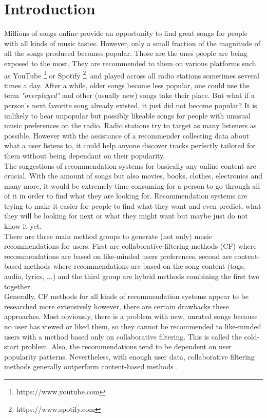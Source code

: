 \chapter*{Introduction}
Millions of songs online provide an opportunity to find great songs for people with all kinds of music tastes. However, only a small fraction of the magnitude of all the songs produced becomes popular. Those are the ones people are being exposed to the most. They are recommended to them on various platforms such as YouTube \footnote{https://www.youtube.com} or Spotify \footnote{https://www.spotify.com}, and played across all radio stations sometimes several times a day. After a while, older songs become less popular, one could use the term \textit{"overplayed"} and other (usually new) songs take their place. But what if a person's next favorite song already existed, it just did not become popular? It is unlikely to hear unpopular but possibly likeable songs for people with unusual music preferences on the radio. Radio stations try to target as many listeners as possible. However with the assistance of a recommender collecting data about what a user listens to, it could help anyone discover tracks perfectly tailored for them without being dependant on their popularity.\\
The suggestions of recommendation systems for basically any online content are crucial. With the amount of songs but also movies, books, clothes, electronics and many more, it would be extremely time consuming for a person to go through all of it in order to find what they are looking for. Recommendation systems are trying to make it easier for people to find what they want and even predict, what they will be looking for next or what they might want but maybe just do not know it yet. \\
There are three main method groups to generate (not only) music recommendations for users. First are collaborative-filtering methods (CF) where recommendations are based on like-minded users preferences, second are content-based methods where recommendations are based on the song content (tags, audio, lyrics, ...) and the third group are hybrid methods combining the first two together. \\
Generally, CF methods for all kinds of recommendation systems appear to be researched more extensively \cite{DBLP:journals/corr/abs-1712-07525} however, there are certain drawbacks these approaches. Most obviously, there is a problem with new, unrated songs because no user has viewed or liked them, so they cannot be recommended to like-minded users with a method based only on collaborative filtering. This is called the cold-start problem. Also, the recommendations tend to be dependent on user popularity patterns. Nevertheless, with enough user data, collaborative filtering methods generally outperform content-based methods \cite{van2013deep}. \\
